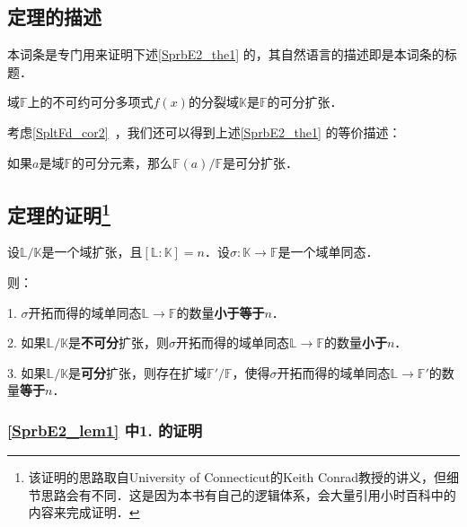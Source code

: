 

\subsection{定理的描述}

本词条是专门用来证明下述\autoref{SprbE2_the1} 的，其自然语言的描述即是本词条的标题．

\begin{theorem}{}\label{SprbE2_the1}
域$\mathbb{F}$上的不可约可分多项式$f(x)$的分裂域$\mathbb{K}$是$\mathbb{F}$的可分扩张．
\end{theorem}

考虑\autoref{SpltFd_cor2}~，我们还可以得到上述\autoref{SprbE2_the1} 的等价描述：

\begin{theorem}{}\label{SprbE2_the2}
如果$a$是域$\mathbb{F}$的可分元素，那么$\mathbb{F}(a)/\mathbb{F}$是可分扩张．
\end{theorem}



\subsection{定理的证明\footnote{该证明的思路取自University of Connecticut的Keith Conrad教授的讲义，但细节思路会有不同．这是因为本书有自己的逻辑体系，会大量引用小时百科中的内容来完成证明．}}

\begin{lemma}{}\label{SprbE2_lem1}
设$\mathbb{L}/\mathbb{K}$是一个域扩张，且$[\mathbb{L}:\mathbb{K}]=n$．设$\sigma:\mathbb{K}\to\mathbb{F}$是一个域单同态．

则：

1. $\sigma$开拓而得的域单同态$\mathbb{L}\to\mathbb{F}$的数量\textbf{小于等于}$n$．

2. 如果$\mathbb{L}/\mathbb{K}$是\textbf{不可分}扩张，则$\sigma$开拓而得的域单同态$\mathbb{L}\to\mathbb{F}$的数量\textbf{小于}$n$．

3. 如果$\mathbb{L}/\mathbb{K}$是\textbf{可分}扩张，则存在扩域$\mathbb{F}'/\mathbb{F}$，使得$\sigma$开拓而得的域单同态$\mathbb{L}\to\mathbb{F}'$的数量\textbf{等于}$n$．

\end{lemma}




\subsubsection{\autoref{SprbE2_lem1} 中1. 的证明}

